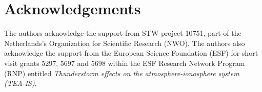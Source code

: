 
\chapter*{Acknowledgements}
%
\label{chap_5}

The authors acknowledge the support from STW-project 10751, part of the Netherlands's Organization for Scientific Research (NWO). The authors also acknowledge the support from the European Science Foundation (ESF) for short visit grants 5297, 5697 and 5698 within the ESF Research Network Program (RNP) entitled \textit{Thunderstorm effects on the atmosphere-ionosphere system (TEA-IS)}. 